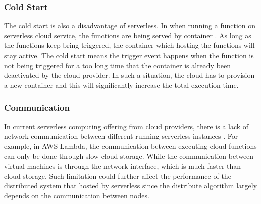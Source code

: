 \subsubsection{Cold Start}
The cold start is also a disadvantage of serverless. In when running a function on serverless cloud service, the functions are being served by container \cite{KeepingF68:online}. As long as the functions keep bring triggered, the container which hosting the functions will stay active. The cold start means the trigger event happens when the function is not being triggered for a too long time that the container is already been deactivated by the cloud provider. In such a situation, the cloud has to provision a new container and this will significantly increase the total execution time.
\subsubsection{Communication}
In current serverless computing offering from cloud providers, there is a lack of network communication between different running serverless instances \cite{hellerstein2018serverless}. For example, in AWS Lambda, the communication between executing cloud functions can only be done through slow cloud storage. While the communication between virtual machines is through the network interface, which is much faster than cloud storage. Such limitation could further affect the performance of the distributed system that hosted by serverless since the distribute algorithm largely depends on the communication between nodes.
